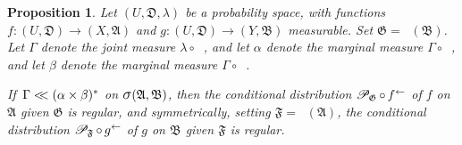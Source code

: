 \documentclass[
twoside=true,
paper=letter,
fontsize=9pt,
pagesize=auto,
leqno,
openany,
headsepline,
overfullrule,
]{scrbook}
\theoremstyle{plain}
\theoremstyle{plain}
\newtheorem{prop}[thm]{Proposition}
\theoremstyle{definition}
\theoremstyle{bfnoteitalic}
\theoremstyle{bfnoteroman}
\newcommand{\sigalg}[1]{\mathfrak{#1}}
\newcommand{\cali}[1]{\mathscr{#1}}
\newcommand{\condprobop}[1]{\mathop{\cali{P}\hspace{-1pt}}\nolimits_{#1}}
\newcommand{\sagb}{\mathop{\hbox{\large{$\sigma$}}}\nolimits}
\newcommand{\preimage}[1]{\mathop{#1^{\leftarrow}}}
\newcommand{\sigmaalgebra}{\sigalg{A}}
\newcommand{\sigmaalgebraii}{\sigalg{B}}
\newcommand{\productsig}[2]{\sagb(#1,#2)}
\newcommand{\funcf}{f}
\newcommand{\funcg}{g}
\newcommand{\measurespace}{X}
\newcommand{\measurespaceii}{Y}
\newcommand{\abscont}{\mathrel{< \kern-3.5pt <}}
\newcommand{\measlambda}{\lambda}
\newcommand{\projectionone}{\pi_1}
\newcommand{\projectiontwo}{\pi_2}
\newcommand{\uspace}{U}%
\newcommand{\uspacesig}{\sigalg{D}}
\newcommand{\measonprod}{\Gamma}%
\newcommand{\marginalone}{\alpha}%
\newcommand{\marginaltwo}{\beta}%
\begin{document}
\begin{prop}\label{marginal_implies_regular}
Let
$(\uspace, \uspacesig, \measlambda)$
be a probability space, with functions
$\funcf:(\uspace,\uspacesig)\to (\measurespace,\sigmaalgebra)$
and
$\funcg:(\uspace,\uspacesig)\to (\measurespaceii,\sigmaalgebraii)$
measurable.
Set
$\sigalg{G} = \preimage{\funcg}(\sigmaalgebraii)$.
Let $\measonprod$ denote the joint measure
$\measlambda\circ\preimage{({\funcf,\funcg})}$,
and let $\marginalone$  denote the marginal measure $\measonprod\circ \preimage{\projectionone}$,
and let $\marginaltwo$ denote the marginal measure $\measonprod\circ \preimage{\projectiontwo}$.

If\,
$\measonprod \abscont (\marginalone\times\marginaltwo)^*$
on
$\productsig{\sigmaalgebra}{\sigmaalgebraii}$,
then the conditional distribution
$\condprobop{\sigalg{G}}\circ \preimage{\funcf}$ of $\funcf$ on
$\sigmaalgebra$ given $\sigalg{G}$ is regular, and symmetrically, setting
$\sigalg{F} = \preimage{\funcf}(\sigmaalgebra)$, the conditional distribution
$\condprobop{\sigalg{F}}\circ \preimage{\funcg}$ of $\funcg$ on
$\sigmaalgebraii$ given $\sigalg{F}$ is regular.
\end{prop}
\end{document}
